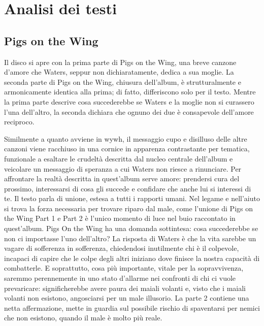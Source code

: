 \documentclass[class=book, crop=false, oneside, 12pt]{standalone}
\begin{document}
    \section{Analisi dei testi}
    \label{sec:02-animals-lyrics}

    \subsection{Pigs on the Wing}
    Il disco si apre con la prima parte di Pigs on the Wing, una breve canzone d'amore che Waters, seppur non dichiaratamente, dedica a sua moglie. La seconda parte di Pigs on the Wing, chiusura dell'album, è strutturalmente e armonicamente  identica alla prima; di fatto, differiscono solo per il testo. Mentre la prima parte descrive cosa succederebbe se Waters e la moglie non si curassero l'una dell'altro, la seconda dichiara che ognuno dei due è consapevole dell'amore reciproco. 

    Similmente a quanto avviene in \acrlong{wywh}, il messaggio cupo e disilluso delle altre canzoni viene racchiuso in una cornice in apparenza contrastante per tematica, funzionale a esaltare le crudeltà descritta dal nucleo centrale dell'album e veicolare un messaggio di speranza a cui Waters non riesce a rinunciare. Per affrontare la realtà descritta in quest'album serve amore: prendersi cura del prossimo, interessarsi di cosa gli succede e confidare che anche lui si interessi di te. Il testo parla di unione, estesa a tutti i rapporti umani. Nel legame e nell'aiuto si trova la forza necessaria per trovare riparo dal male, come l'unione di Pigs on the Wing Part 1 e Part 2  è l'unico momento di luce nel buio raccontato in quest'album. Pigs On the Wing ha una domanda sottintesa: cosa succederebbe se non ci importasse l'uno dell'altro? La risposta di Waters è che la vita sarebbe un vagare di sofferenza in sofferenza, chiedendosi inutilmente chi è il colpevole, incapaci di capire che le colpe degli altri iniziano dove finisce la nostra capacità di combatterle. E soprattutto, cosa più importante, vitale per la sopravvivenza, saremmo perennemente in uno stato d'allarme nei confronti di chi ci vuole prevaricare: significherebbe avere paura dei maiali volanti e, visto che i maiali volanti non esistono, angosciarsi per un male illusorio. La parte 2 contiene una netta affermazione, mette in guardia sul possibile rischio di spaventarsi per nemici che non esistono, quando il male è molto più reale. 
\end{document}
